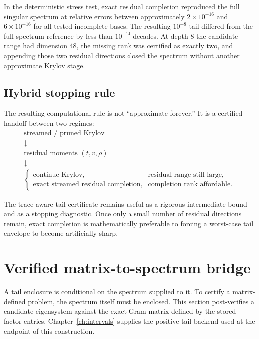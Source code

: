 In the deterministic stress test, exact residual completion reproduced the
full singular spectrum at relative errors between approximately
\(2\times10^{-16}\) and \(6\times10^{-16}\) for all tested incomplete bases.
The resulting \(10^{-8}\) tail differed from the full-spectrum reference by
less than \(10^{-14}\) decades.  At depth 8 the candidate range had dimension
48, the missing rank was certified as exactly two, and appending those two
residual directions closed the spectrum without another approximate Krylov
stage.

\subsection{Hybrid stopping rule}

The resulting computational rule is not ``approximate forever.''  It is a
certified handoff between two regimes:
\[
\boxed{
\begin{array}{c}
\text{streamed / pruned Krylov}\\[2mm]
\downarrow\\[-1mm]
\text{residual moments }(t,v,\rho)\\[2mm]
\downarrow\\[-1mm]
\begin{cases}
\text{continue Krylov}, & \text{residual range still large},\\
\text{exact streamed residual completion}, & \text{completion rank affordable}.
\end{cases}
\end{array}
}
\]

The trace-aware tail certificate remains useful as a rigorous intermediate
bound and as a stopping diagnostic.  Once only a small number of residual
directions remain, exact completion is mathematically preferable to forcing a
worst-case tail envelope to become artificially sharp.


\section{Verified matrix-to-spectrum bridge}\label{sec:final-6}

A tail enclosure is conditional on the spectrum supplied to it. To certify a
matrix-defined problem, the spectrum itself must be enclosed. This section
post-verifies a candidate eigensystem against the exact Gram matrix defined
by the stored factor entries. Chapter~\ref{ch:intervals} supplies the
positive-tail backend used at the endpoint of this construction.

